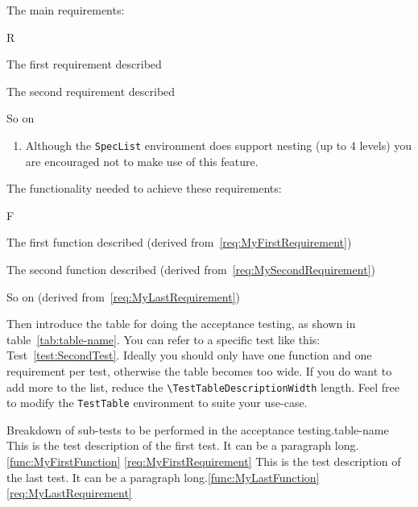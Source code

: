 The main requirements:

\begin{SpecList}{R}
  \item \label{req:MyFirstRequirement}  The first requirement described
  \item \label{req:MySecondRequirement} The second requirement described
  \item \label{req:MyLastRequirement}   So on
  \begin{enumerate}
    \item Although the \verb|SpecList| environment does support nesting (up to 4 levels) you are encouraged not to make use of this feature.
  \end{enumerate}
\end{SpecList}

The functionality needed to achieve these requirements:

\begin{SpecList}{F}
  \item \label{func:MyFirstFunction}  The first function described (derived from~\ref{req:MyFirstRequirement})
  \item \label{func:MySecondFunction} The second function described (derived from~\ref{req:MySecondRequirement})
  \item \label{func:MyLastFunction}   So on (derived from~\ref{req:MyLastRequirement})
\end{SpecList}

Then introduce the table for doing the acceptance testing, as shown in table~\ref{tab:table-name}.  You can refer to a specific test like this: Test~\ref{test:SecondTest}.  Ideally you should only have one function and one requirement per test, otherwise the table becomes too wide.  If you do want to add more to the list, reduce the \verb|\TestTableDescriptionWidth| length.  Feel free to modify the \verb|TestTable| environment to suite your use-case.

\begin{TestTable}{Breakdown of sub-tests to be performed in the acceptance testing.}{table-name}
   {This is the test description of the first test.   It can be a paragraph long.}{\ref{func:MyFirstFunction}} {\ref{req:MyFirstRequirement}}
    {This is the test description of the last test.    It can be a paragraph long.}{\ref{func:MyLastFunction}}  {\ref{req:MyLastRequirement}}
\end{TestTable}

